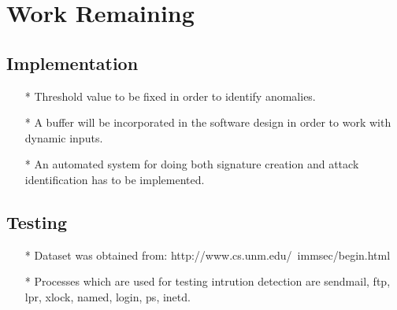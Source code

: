\section{Work Remaining}

\subsection{Implementation}

\begin{itemize}
    \item[*] Threshold value to be fixed in order to identify anomalies.
    \item[*] A buffer will be incorporated in the software design in order to work with dynamic inputs.
    \item[*] An automated system for doing both signature creation and attack identification has to be implemented.
\end{itemize}

\subsection{Testing}

    \begin{itemize}
        \item[*] Dataset was obtained from: http://www.cs.unm.edu/~immsec/begin.html
        \item[*] Processes which are used for testing intrution detection are sendmail, ftp, lpr, xlock, named, login, ps, inetd.
    \end{itemize}
